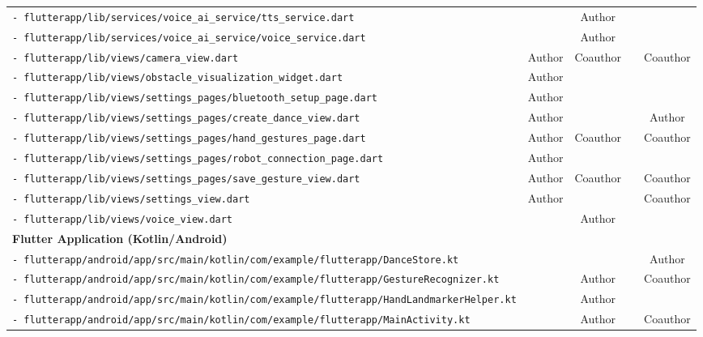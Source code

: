 \documentclass[11pt,a4paper]{article}
\begin{document}
\begin{longtable}{|p{}|c|c|c|c|}
\texttt{- flutterapp\slash lib\slash services\slash voice\_ai\_service\slash tts\_service.dart} & & Author & & \\
\texttt{- flutterapp\slash lib\slash services\slash voice\_ai\_service\slash voice\_service.dart} & & Author & & \\
\texttt{- flutterapp\slash lib\slash views\slash camera\_view.dart} & Author & Coauthor & & Coauthor\\
\texttt{- flutterapp\slash lib\slash views\slash obstacle\_visualization\_widget.dart} & Author & & & \\
\texttt{- flutterapp\slash lib\slash views\slash settings\_pages\slash bluetooth\_setup\_page.dart} & Author & & & \\
\texttt{- flutterapp\slash lib\slash views\slash settings\_pages\slash create\_dance\_view.dart} & Author & & & Author \\
\texttt{- flutterapp\slash lib\slash views\slash settings\_pages\slash hand\_gestures\_page.dart} & Author & Coauthor & & Coauthor \\
\texttt{- flutterapp\slash lib\slash views\slash settings\_pages\slash robot\_connection\_page.dart} & Author & & & \\
\texttt{- flutterapp\slash lib\slash views\slash settings\_pages\slash save\_gesture\_view.dart} & Author & Coauthor & & Coauthor \\
\texttt{- flutterapp\slash lib\slash views\slash settings\_view.dart} & Author & & & Coauthor \\
\texttt{- flutterapp\slash lib\slash views\slash voice\_view.dart} & & Author & & \\
\hline
\multicolumn{5}{|l|}{\textbf{Flutter Application (Kotlin/Android)}} \\
\hline
\texttt{- flutterapp\slash android\slash app\slash src\slash main\slash kotlin\slash com\slash example\slash flutterapp\slash DanceStore.kt} & & & & Author\\
\texttt{- flutterapp\slash android\slash app\slash src\slash main\slash kotlin\slash com\slash example\slash flutterapp\slash GestureRecognizer.kt} & & Author & & Coauthor \\
\texttt{- flutterapp\slash android\slash app\slash src\slash main\slash kotlin\slash com\slash example\slash flutterapp\slash HandLandmarkerHelper.kt} & & Author & & \\
\texttt{- flutterapp\slash android\slash app\slash src\slash main\slash kotlin\slash com\slash example\slash flutterapp\slash MainActivity.kt} & & Author & & Coauthor \\

\end{longtable}
\end{document}
